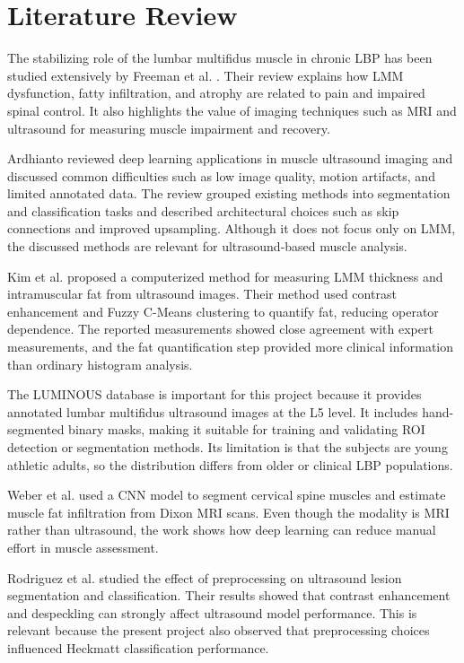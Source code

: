 \chapter{Literature Review}
\label{chap:literature_review}
\label{relatedwork}
The stabilizing role of the lumbar multifidus muscle in chronic LBP has been studied extensively by Freeman et al. \cite{Freeman2010}. Their review explains how LMM dysfunction, fatty infiltration, and atrophy are related to pain and impaired spinal control. It also highlights the value of imaging techniques such as MRI and ultrasound for measuring muscle impairment and recovery.

Ardhianto \cite{DeepLearningChallenges2021} reviewed deep learning applications in muscle ultrasound imaging and discussed common difficulties such as low image quality, motion artifacts, and limited annotated data. The review grouped existing methods into segmentation and classification tasks and described architectural choices such as skip connections and improved upsampling. Although it does not focus only on LMM, the discussed methods are relevant for ultrasound-based muscle analysis.

Kim et al. \cite{Kim2020} proposed a computerized method for measuring LMM thickness and intramuscular fat from ultrasound images. Their method used contrast enhancement and Fuzzy C-Means clustering to quantify fat, reducing operator dependence. The reported measurements showed close agreement with expert measurements, and the fat quantification step provided more clinical information than ordinary histogram analysis.

The LUMINOUS database \cite{Belasso2020} is important for this project because it provides annotated lumbar multifidus ultrasound images at the L5 level. It includes hand-segmented binary masks, making it suitable for training and validating ROI detection or segmentation methods. Its limitation is that the subjects are young athletic adults, so the distribution differs from older or clinical LBP populations.

Weber et al. \cite{Weber2021} used a CNN model to segment cervical spine muscles and estimate muscle fat infiltration from Dixon MRI scans. Even though the modality is MRI rather than ultrasound, the work shows how deep learning can reduce manual effort in muscle assessment.

Rodriguez et al. \cite{Rodriguez2017} studied the effect of preprocessing on ultrasound lesion segmentation and classification. Their results showed that contrast enhancement and despeckling can strongly affect ultrasound model performance. This is relevant because the present project also observed that preprocessing choices influenced Heckmatt classification performance.

